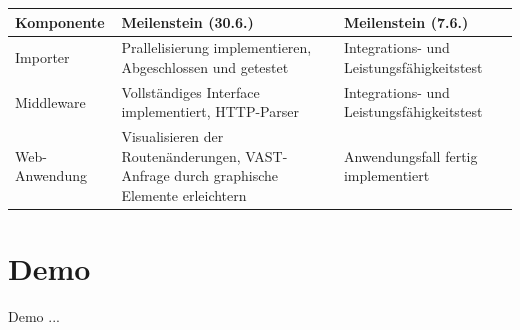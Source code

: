 \documentclass[9pt]{beamer}
\begin{document}
\begin{frame}
	\begin{table}[h!]
	\centering
	\begin{tabular}{p{5em} p{12em} p{12em}}
		\textbf{Komponente} & \textbf{Meilenstein (30.6.)} & \textbf{Meilenstein (7.6.)} \\ \midrule
		Importer & Prallelisierung implementieren, Abgeschlossen und getestet & Integrations- und Leistungsfähigkeitstest \\ \midrule
		Middleware & Vollständiges Interface implementiert, HTTP-Parser	& Integrations- und Leistungsfähigkeitstest \\ \midrule
		Web-Anwendung & Visualisieren der Routenänderungen, VAST-Anfrage durch graphische Elemente erleichtern & Anwendungsfall fertig implementiert \\ \bottomrule
	\end{tabular}
	\end{table}
\end{frame}

\section{Demo}

\begin{frame}{Demo}{}
	...
\end{frame}
\end{document}
